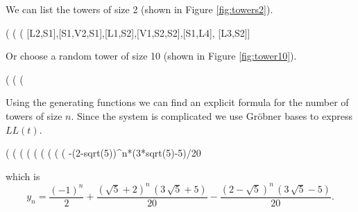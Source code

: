 \documentclass[11pt]{article}
\begin{document}
%
We can list the towers of size 2 (shown in Figure \ref{fig:towers2}).

\begin{example}
(%
(%
(%
       [L2,S1],[S1,V2,S1],[L1,S2],[V1,S2,S2],[S1,L4],
       [L3,S2]]
\end{example}
%
Or choose a random tower of size 10 (shown in Figure \ref{fig:tower10}).
\begin{example}
(%
(%
(%
\end{example}
%
Using the generating functions we can find an explicit formula for
the number of towers of size $n$. Since the system is complicated
we use Gr\"obner bases to express $LL(t)$.

\begin{example}
(%
(%
(%
(%
(%
(%
(%
(%
(%
                      -(2-sqrt(5))^n*(3*sqrt(5)-5)/20
\end{example}
which is
$$
{y}_{n}=\frac{{\left( -1\right) }^{n}}{2}+\frac{{\left( \sqrt{5}+2\right) }^{n}\,\left( 3\,\sqrt{5}+5\right) }{20}-\frac{{\left( 2-\sqrt{5}\right) }^{n}\,\left( 3\,\sqrt{5}-5\right) }{20}.
$$
\end{document}
